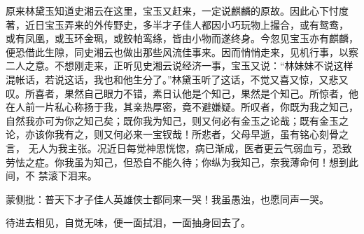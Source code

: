 \begin{parag}


    原来林黛玉知道史湘云在这里，宝玉又赶来，一定说麒麟的原故。因此心下忖度著，近日宝玉弄来的外传野史，多半才子佳人都因小巧玩物上撮合，或有鸳鸯， 或有凤凰，或玉环金珮，或鲛帕鸾绦，皆由小物而遂终身。今忽见宝玉亦有麒麟，便恐借此生隙，同史湘云也做出那些风流佳事来。因而悄悄走来，见机行事，以察二人之意。不想刚走来，正听见史湘云说经济一事，宝玉又说：“林妹妹不说这样混帐话，若说这话，我也和他生分了。”林黛玉听了这话，不觉又喜又惊，又悲又 叹。所喜者，果然自己眼力不错，素日认他是个知己，果然是个知己。所惊者，他在人前一片私心称扬于我，其亲热厚密，竟不避嫌疑。所叹者，你既为我之知己， 自然我亦可为你之知己矣；既你我为知己，则又何必有金玉之论哉；既有金玉之论，亦该你我有之，则又何必来一宝钗哉！所悲者，父母早逝，虽有铭心刻骨之言， 无人为我主张。况近日每觉神思恍惚，病已渐成，医者更云气弱血亏，恐致劳怯之症。你我虽为知己，但恐自不能久待；你纵为我知己，奈我薄命何！想到此间，不 禁滚下泪来。\begin{note}蒙侧批：普天下才子佳人英雄侠士都同来一哭！我虽愚浊，也愿同声一哭。\end{note}待进去相见，自觉无味，便一面拭泪，一面抽身回去了。
\end{parag}


